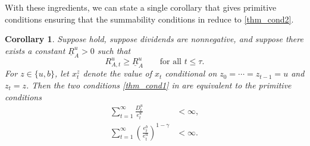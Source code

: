 \documentclass[12pt]{article}
\theoremstyle{plain}
\newtheorem{coro}{Corollary}
\begin{document}
With these ingredients, we can state a single
corollary that gives primitive conditions ensuring that the summability conditions
in  reduce to \eqref{thm_cond2}.

\begin{coro}\label{coro1}
Suppose
hold, suppose dividends are nonnegative, and suppose there exists a constant $\underline R_A^u>0$ such that
\[
R_{A,t}^u\ge \underline R_A^u
\qquad\text{for all }t\le\tau.
\]
For $z\in\{u,b\}$, let $x_t^z$ denote the value of $x_t$ conditional on $z_0=\cdots=z_{t-1}=u$ and $z_t=z$.
Then the two conditions \eqref{thm_cond1} in  are equivalent to the primitive conditions
\begin{subequations}\label{thm_cond2}
\begin{align}
\sum_{t=1}^\infty \frac{D_t^u}{e_{t}^u}&<\infty, \label{thm_cond_2a}\\
\sum_{t=1}^\infty
\left(\frac{e_{t}^b}{e_{t}^u}\right)^{1-\gamma}&<\infty. \label{thm_cond_2b}
\end{align}
\end{subequations}
\end{coro}
\end{document}
